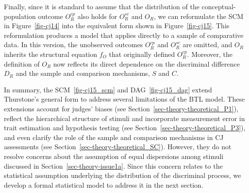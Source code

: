 \documentclass[
  authoryear,
  review,
  1p]{elsarticle}
\begin{document}
Finally, since it is standard to assume that the distribution of the
conceptual-population outcome \(O^{cp}_{R}\) also holds for
\(O^{sc}_{R}\) and \(O_{R}\), we can reformulate the SCM in
Figure~\ref{fig-cj14} into the equivalent form shown in
Figure~\ref{fig-cj15}. This reformulation produces a model that applies
directly to a sample of comparative data. In this version, the
unobserved outcomes \(O^{cp}_{R}\) and \(O^{sc}_{R}\) are omitted, and
\(O_{R}\) inherits the structural equation \(f_{O}\) that originally
defined \(O^{cp}_{R}\). Moreover, the definition of \(O_{R}\) now
reflects its direct dependence on the discriminal difference \(D_{R}\)
and the sample and comparison mechanisms, \(S\) and \(C\).

In summary, the SCM~\ref{fig-cj15_scm} and DAG~\ref{fig-cj15_dag} extend
Thurstone's general form to address several limitations of the BTL
model. These extensions account for judges' biases (see
Section~\ref{sec-theory-theoretical_P1}), reflect the hierarchical
structure of stimuli and incorporate measurement error in trait
estimation and hypothesis testing (see
Section~\ref{sec-theory-theoretical_P3}), and even clarify the role of
the sample and comparison mechanisms in CJ assessments (see
Section~\ref{sec-theory-theoretical_SC}). However, they do not resolve
concerns about the assumption of equal dispersions among stimuli
discussed in Section~\ref{sec-theory-issue1a}. Since this concern
relates to the statistical assumption underlying the distribution of the
discriminal process, we develop a formal statistical model to address it
in the next section.
\end{document}
